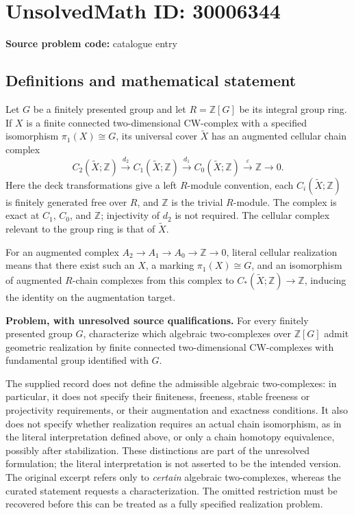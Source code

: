 \documentclass[11pt]{article}
\newcommand{\Z}{\mathbb{Z}}
\begin{document}
\section*{UnsolvedMath ID: 30006344}
\textbf{Source problem code:} catalogue entry
\subsection{Definitions and mathematical statement}
Let \(G\) be a finitely presented group and let \(R=\Z[G]\) be its integral group ring. If \(X\) is a finite connected two-dimensional CW-complex with a specified isomorphism \(\pi_1(X)\cong G\), its universal cover \(\widetilde X\) has an augmented cellular chain complex
\[
C_2(\widetilde X;\Z)\xrightarrow{d_2}C_1(\widetilde X;\Z)\xrightarrow{d_1}C_0(\widetilde X;\Z)\xrightarrow{\varepsilon}\Z\longrightarrow0.
\]
Here the deck transformations give a left \(R\)-module convention, each \(C_i(\widetilde X;\Z)\) is finitely generated free over \(R\), and \(\Z\) is the trivial \(R\)-module. The complex is exact at \(C_1\), \(C_0\), and \(\Z\); injectivity of \(d_2\) is not required. The cellular complex relevant to the group ring is that of \(\widetilde X\).

For an augmented complex \(A_2\to A_1\to A_0\to\Z\to0\), literal cellular realization means that there exist such an \(X\), a marking \(\pi_1(X)\cong G\), and an isomorphism of augmented \(R\)-chain complexes from this complex to \(C_*(\widetilde X;\Z)\to\Z\), inducing the identity on the augmentation target.

\textbf{Problem, with unresolved source qualifications.} For every finitely presented group \(G\), characterize which algebraic two-complexes over \(\Z[G]\) admit geometric realization by finite connected two-dimensional CW-complexes with fundamental group identified with \(G\).

The supplied record does not define the admissible algebraic two-complexes: in particular, it does not specify their finiteness, freeness, stable freeness or projectivity requirements, or their augmentation and exactness conditions. It also does not specify whether realization requires an actual chain isomorphism, as in the literal interpretation defined above, or only a chain homotopy equivalence, possibly after stabilization. These distinctions are part of the unresolved formulation; the literal interpretation is not asserted to be the intended version. The original excerpt refers only to \emph{certain} algebraic two-complexes, whereas the curated statement requests a characterization. The omitted restriction must be recovered before this can be treated as a fully specified realization problem.
\end{document}
